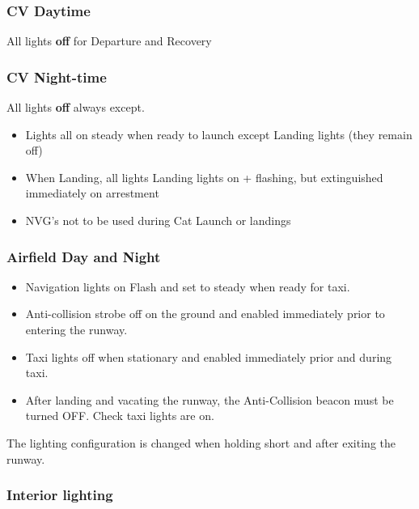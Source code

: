 \subsubsection{CV Daytime}

All lights \textbf{off} for Departure and Recovery

\subsubsection{CV Night-time}

All lights \textbf{off} always except.

\begin{itemize}
  \setlength\parskip{0pt}

  \item Lights all on steady when ready to launch except Landing lights (they
    remain off)

  \item When Landing, all lights Landing lights on + flashing, but extinguished
    immediately on arrestment

  \item NVG's not to be used during Cat Launch or landings

\end{itemize}


\subsubsection{Airfield Day and Night}

\begin{itemize}
  \item Navigation lights on Flash and set to steady when ready for taxi.

  \item Anti-collision strobe off on the ground and enabled immediately prior
    to entering the runway.

  \item Taxi lights off when stationary and enabled immediately prior and
    during taxi.

  \item After landing and vacating the runway, the Anti-Collision beacon must
    be turned OFF. Check taxi lights are on.
\end{itemize}

The lighting configuration is changed when holding short and after exiting the
runway.

\subsubsection{Interior lighting}

